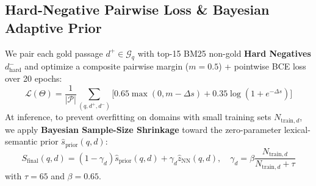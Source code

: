 \documentclass[10pt,twocolumn]{article}
\begin{document}
\subsection{Hard-Negative Pairwise Loss \& Bayesian Adaptive Prior}
We pair each gold passage $d^+ \in \mathcal{G}_q$ with top-15 BM25 non-gold \textbf{Hard Negatives} $d^-_{\text{hard}}$ and optimize a composite pairwise margin ($m=0.5$) + pointwise BCE loss over 20 epochs:
\begin{equation}
\mathcal{L}(\Theta) = \frac{1}{|\mathcal{P}|}\sum_{(q,d^+,d^-)} \Big[ 0.65 \max(0, m - \Delta s) + 0.35 \log(1 + e^{-\Delta s}) \Big]
\end{equation}
At inference, to prevent overfitting on domains with small training sets $N_{\text{train}, d}$, we apply \textbf{Bayesian Sample-Size Shrinkage} toward the zero-parameter lexical-semantic prior $\hat{s}_{\text{prior}}(q,d)$:
\begin{equation}
S_{\text{final}}(q,d) = (1 - \gamma_d)\hat{s}_{\text{prior}}(q,d) + \gamma_d \hat{z}_{\text{NN}}(q,d), \quad \gamma_d = \beta \frac{N_{\text{train}, d}}{N_{\text{train}, d} + \tau}
\end{equation}
with $\tau = 65$ and $\beta = 0.65$.
\end{document}
